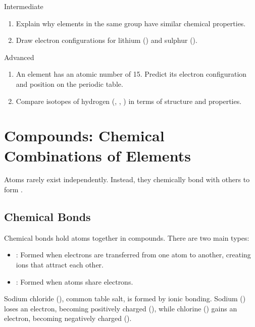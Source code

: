\begin{tieredquestions}{Intermediate}
\begin{enumerate}
    \item Explain why elements in the same group have similar chemical properties.
    \item Draw electron configurations for lithium () and sulphur ().
\end{enumerate}
\end{tieredquestions}

\begin{tieredquestions}{Advanced}
\begin{enumerate}
    \item An element has an atomic number of 15. Predict its electron configuration and position on the periodic table.
    \item Compare isotopes of hydrogen (, , ) in terms of structure and properties.
\end{enumerate}
\end{tieredquestions}

\section{Compounds: Chemical Combinations of Elements}

Atoms rarely exist independently. Instead, they chemically bond with others to form .

\subsection{Chemical Bonds}

Chemical bonds hold atoms together in compounds. There are two main types:
\begin{itemize}
    \item {}: Formed when electrons are transferred from one atom to another, creating ions that attract each other.
    \item {}: Formed when atoms share electrons.
\end{itemize}

\begin{example}
Sodium chloride (), common table salt, is formed by ionic bonding. Sodium () loses an electron, becoming positively charged (), while chlorine () gains an electron, becoming negatively charged ().
\end{example}

